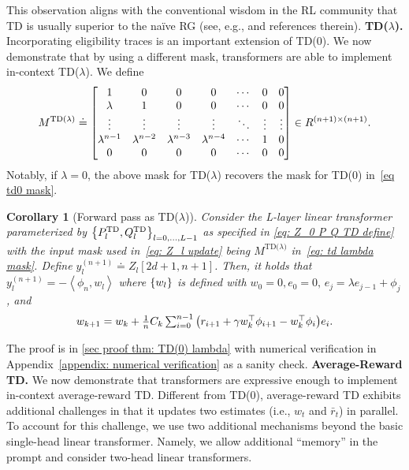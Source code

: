 \documentclass{article}
\newcommand{\tb}[1]{{\textbf{#1}}}
\newcommand{\indot}[2]{{\left<#1, #2\right>}}
\newcommand{\td}{\text{TD}}
\newcommand{\tdlambda}{\text{TD($\lambda$)}}
\newtheorem{corollary}{Corollary}
\begin{document}
This observation aligns with the conventional wisdom in the RL community that TD is usually superior to the naïve RG (see, e.g., \citet{zhang2019deep} and references therein).
\tb{TD($\lambda$).}
Incorporating eligibility traces is an important extension of TD(0).
We now demonstrate that by using a different mask,
transformers are able to implement in-context TD($\lambda$).
We define
\begin{align}
    M^\tdlambda \doteq
    \mqty[1 & 0 & 0 & 0 & \cdots & 0 & 0\\
    \lambda & 1 & 0 & 0 & \cdots & 0 & 0\\
    \vdots & \vdots & \vdots & \vdots & \ddots & \vdots & \vdots\\
    \lambda^{n-1} & \lambda^{n-2} & \lambda^{n-3} & \lambda^{n-4} & \cdots & 1 & 0\\
    0 & 0 & 0 & 0 & \cdots & 0 & 0] \in R^{(n+1)\times(n+1)}. \label{eq: td lambda mask}
\end{align}
Notably, if $\lambda = 0$, the above mask for TD($\lambda$) recovers the mask for TD(0) in~\eqref{eq td0 mask}.
\begin{corollary}[Forward pass as TD($\lambda$)]
\label{thm: TD(0) lambda}
    Consider the L-layer linear transformer parameterized by $\qty{P_l^{\td}, Q_l^{\td}}_{l=0,\dots, L-1}$ as specified in \eqref{eq: Z_0 P Q TD define}
    with the input mask used in~\eqref{eq: Z_l update} being
    $M^\tdlambda$ in~\eqref{eq: td lambda mask}.
    Define $y_l^{(n+1)} \doteq Z_l[2d+1, n+1]$.
    Then, it holds that $y_l^{(n+1)} =  - \indot{\phi_n}{w_l}$ where $\qty{w_l}$ is defined with $w_0 = 0, e_0 = 0, \, e_j = \lambda e_{j-1} + \phi_j$, and
    \begin{align}
    \textstyle w_{k+1} = w_k + \frac{1}{n}C_k\sum_{i=0}^{n-1} \qty(r_{i+1} + \gamma w_k^\top \phi_{i+1} - w_k^\top \phi_i )e_i.
    \end{align}
\end{corollary}
The proof is in \ref{sec proof thm: TD(0) lambda} with numerical verification in Appendix~\ref{appendix: numerical verification} as a sanity check.
\tb{Average-Reward TD.}
We now demonstrate that transformers are expressive enough to implement in-context average-reward TD.
Different from TD(0),
average-reward TD \citep{tsitsiklis1999average} exhibits additional challenges in that it updates two estimates (i.e., $w_t$ and $\bar r_t$) in parallel.
To account for this challenge,
we use two additional mechanisms beyond the basic single-head linear transformer.
Namely,
we allow additional ``memory'' in the prompt and consider two-head linear transformers.
\end{document}
